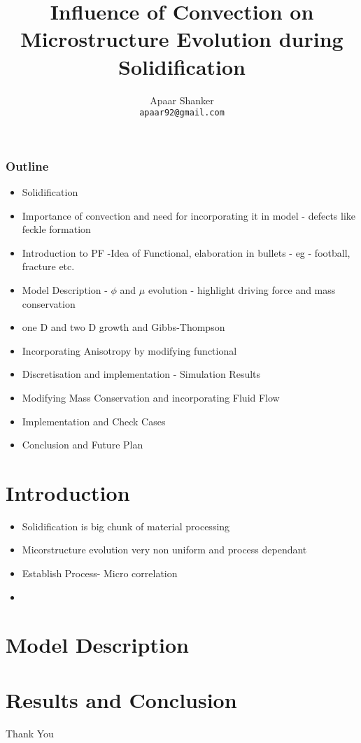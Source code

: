 \documentclass[11pt]{beamer}
\author{Apaar Shanker \\ \texttt{apaar92@gmail.com}}
\title[Modelling Dendritic Solidification with Convection]{Influence of Convection on Microstructure Evolution during Solidification}
\institute{Indian Institute of Science}
\date{}
\begin{document}
	\begin{frame}
		\titlepage
	\end{frame}

	\begin{frame}
		\frametitle{Outline}
		\tableofcontents%
	\end{frame}
	
	\begin{frame}
		\begin{itemize}
			\item Solidification
			\item Importance of convection and need for incorporating it in model - defects like feckle formation
			\item Introduction to PF  -Idea of Functional, elaboration in bullets - eg - football, fracture etc. 
			\item Model Description - $\phi$ and $\mu$ evolution - highlight driving force and mass conservation
			\item one D and two D growth and Gibbs-Thompson
		\end{itemize}		
	\end{frame}
	\begin{frame}
		\begin{itemize}
			\item Incorporating Anisotropy by modifying functional
			\item Discretisation and implementation - Simulation Results
			\item Modifying Mass Conservation and incorporating Fluid Flow
			\item Implementation and Check Cases
			\item Conclusion and Future Plan
		\end{itemize}
	\end{frame}
	\section{Introduction}
	\begin{frame}
		\begin{itemize}
			\item Solidification is big chunk of material processing
			\item Micorstructure evolution very non uniform and process dependant
			\item Establish Process- Micro correlation
			\item 
		\end{itemize}		
	\end{frame}
	
	\section{Model Description}
	\begin{frame}
	\end{frame}
	
	\section{Results and Conclusion}
	\begin{frame}
	\end{frame}
	
	\begin{frame}
		\begin{center}
			Thank You
		\end{center}
	\end{frame}	
\end{document}
